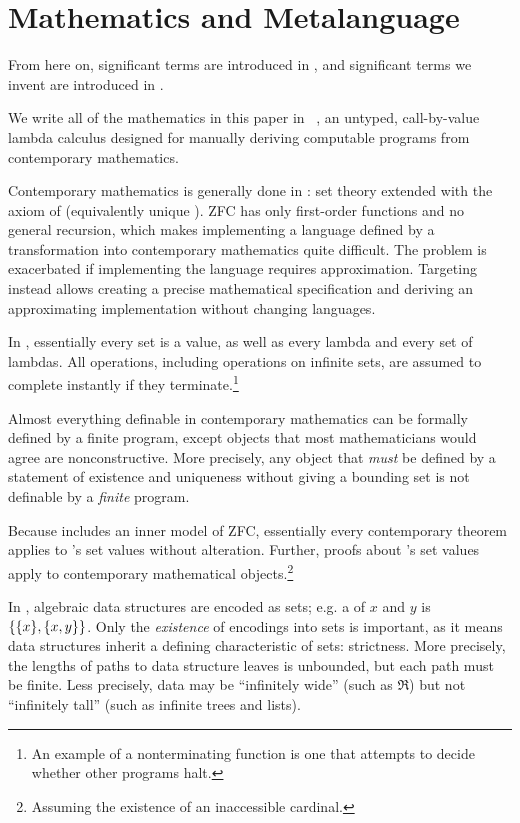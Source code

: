 \documentclass[preprint]{sigplanconf}
\begin{document}

\section{Mathematics and Metalanguage}

From here on, significant terms are introduced in , and significant terms we invent are introduced in .

We write all of the mathematics in this paper in \lzfclang~\cite{cit:toronto-2012flops-lzfc}, an untyped, call-by-value lambda calculus designed for manually deriving computable programs from contemporary mathematics.

Contemporary mathematics is generally done in :  set theory extended with the axiom of  (equivalently unique ).
ZFC has only first-order functions and no general recursion, which makes implementing a language defined by a transformation into contemporary mathematics quite difficult.
The problem is exacerbated if implementing the language requires approximation.
Targeting \lzfclang instead allows creating a precise mathematical specification and deriving an approximating implementation without changing languages.

In \lzfclang, essentially every set is a value, as well as every lambda and every set of lambdas.
All operations, including operations on infinite sets, are assumed to complete instantly if they terminate.\footnote{An
example of a nonterminating \lzfclang function is one that attempts to decide whether other \lzfclang programs halt.}

Almost everything definable in contemporary mathematics can be formally defined by a finite \lzfclang program, except objects that most mathematicians would agree are nonconstructive.
More precisely, any object that \emph{must} be defined by a statement of existence and uniqueness without giving a bounding set is not definable by a \emph{finite} \lzfclang program.

Because \lzfclang includes an inner model of ZFC, essentially every contemporary theorem applies to \lzfclang's set values without alteration.
Further, proofs about \lzfclang's set values apply to contemporary mathematical objects.\footnote{Assuming the existence of an inaccessible cardinal.}

In \lzfclang, algebraic data structures are encoded as sets; e.g. a  of $x$ and $y$ is $\{{\{{x}\},\{{x,y}\}}\}$.
Only the \emph{existence} of encodings into sets is important, as it means data structures inherit a defining characteristic of sets: strictness.
More precisely, the lengths of paths to data structure leaves is unbounded, but each path must be finite.
Less precisely, data may be ``infinitely wide'' (such as $\Re$) but not ``infinitely tall'' (such as infinite trees and lists).
\end{document}
